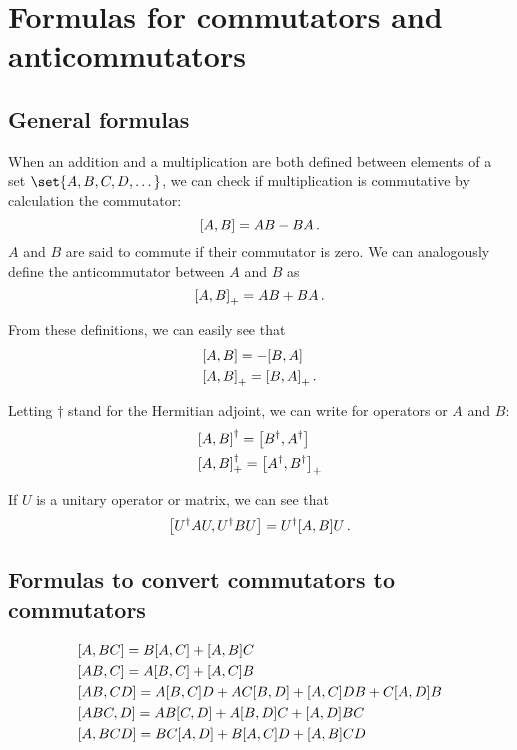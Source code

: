 \section{Formulas for commutators and anticommutators}
    \subsection{General formulas}
        When an addition and a multiplication are both defined between elements of a set $\set{A, B, C, D, \dots}$, we can check if multiplication is commutative by calculation the commutator:
        \begin{equation}
            \comm{A}{B} = AB - BA \thinspace .
        \end{equation}
        $A$ and $B$ are said to commute if their commutator is zero. We can analogously define the anticommutator between $A$ and $B$ as
        \begin{equation}
            \comm{A}{B}_+ = AB + BA \thinspace .
        \end{equation}

        From these definitions, we can easily see that
        \begin{align}
            & \comm{A}{B} = - \comm{B}{A} \\
            & \comm{A}{B}_+ = \comm{B}{A}_+ \thinspace .
        \end{align}

        Letting $\dagger$ stand for the Hermitian adjoint, we can write for operators or $A$ and $B$:
        \begin{align}
            & \comm{A}{B}^\dagger = \comm{B^\dagger}{A^\dagger} \\
            & \comm{A}{B}^\dagger_+ = \comm{A^\dagger}{B^\dagger}_+
        \end{align}

        If $U$ is a unitary operator or matrix, we can see that
        \begin{equation}
            \comm{U^\dagger A U}{U^\dagger B U } = U^\dagger \comm{A}{B} U \thinspace .
        \end{equation}

    \subsection{Formulas to convert commutators to commutators}
        \begin{align}
            & \comm{A}{BC} = B \comm{A}{C} + \comm{A}{B} C \\
            & \comm{AB}{C} = A \comm{B}{C} + \comm{A}{C}B \\
            & \comm{AB}{CD} = A \comm{B}{C} D + AC \comm{B}{D} + \comm{A}{C} DB + C \comm{A}{D} B \\
            & \comm{ABC}{D} = AB \comm{C}{D} + A \comm{B}{D} C + \comm{A}{D} BC \\
            & \comm{A}{BCD} = BC \comm{A}{D} + B \comm{A}{C} D + \comm{A}{B} CD
        \end{align}

